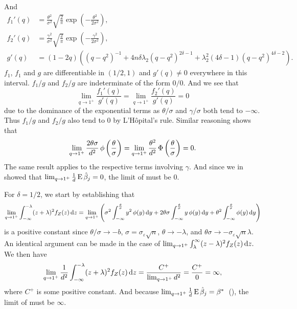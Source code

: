 And
\begin{align*}
  f_1'(q) & = \frac{\theta^2}{\sigma^2}\sqrt{\frac{2}{\pi}}\exp\left(-\frac{\theta^2}{2\sigma^2}\right),                                    \\
  f_2'(q) & = \frac{\gamma^2}{\sigma^2}\sqrt{\frac{2}{\pi}}\exp\left(-\frac{\gamma^2}{2\sigma^2}\right),                                    \\
  g'(q)   & = (1-2q)\left((q-q^2)^{-1} + 4n\delta \lambda_2 (q-q^2)^{2\delta - 1} + \lambda_2^2 (4 \delta - 1)(q-q^2)^{4\delta - 2}\right).
\end{align*}
\(f_1\), \(f_1\) and \(g\) are differentiable in \((1/2, 1)\) and \(g'(q) \neq 0\) everywhere in this interval. \(f_1/g\) and \(f_2/g\) are indeterminate of the form \(0/0\). And we see that
\[
  \lim_{q \rightarrow 1^+} \frac{f_1'(q)}{g'(q)} = \lim_{q \rightarrow 1^+} \frac{f_2'(q)}{g'(q)} = 0
\]
due to the dominance of the exponential terms as \(\theta/\sigma\) and \(\gamma/\sigma\)
both tend to \(-\infty\). Thus \(f_1/g\) and \(f_2/g\) also tend to 0 by L'Hôpital's rule.
Similar reasoning shows that
\[
  \lim_{q \rightarrow 1^+} \frac{2\theta \sigma}{d^2} \operatorname{\phi} \left(\frac{\theta}{\sigma}\right) = \lim_{q \rightarrow 1^+} \frac{\theta^2}{d^2} \operatorname{\Phi} \left(\frac{\theta}{\sigma}\right) = 0.
\]
The same result applies to the respective terms involving \(\gamma\). And since we in
 showed that \(\lim_{q\rightarrow 1^+} \frac{1}{d} \operatorname{E}
\hat{\beta}_j = 0\), the limit of  must be 0.

For \(\delta = 1/2\), we start by establishing that
\[
  \lim_{q \rightarrow 1^+} \int_{-\infty}^{-\lambda}(z+ \lambda)^2 f_Z(z) \mathop{}\!\mathrm{d} z = \lim_{q \rightarrow 1^+} \left(\sigma^2 \int_{-\infty}^\frac{\theta}{\sigma} y^2 \operatorname{\phi}(y) \mathop{}\!\mathrm{d} y + 2 \theta \sigma \int_{-\infty}^\frac{\theta}{\sigma} y \operatorname{\phi}(y) \mathop{}\!\mathrm{d} y + \theta^2 \int_{-\infty}^\frac{\theta}{\sigma} \operatorname{\phi}(y) \mathop{}\!\mathrm{d} y\right)
\]
is a positive constant since \(\theta/\sigma \rightarrow -b\), \(\sigma =
\sigma_\varepsilon \sqrt{n}\), \(\theta \rightarrow - \lambda\), and \(\theta\sigma
\rightarrow - \sigma_\varepsilon \sqrt{n}\lambda\). An identical argument can be made in
the case of \(\lim_{q \rightarrow 1^+} \int_{\lambda}^{\infty}(z - \lambda)^2 f_Z(z) \mathop{}\!\mathrm{d}
z.\) We then have
\[
  \lim_{q \rightarrow 1^+} \frac{1}{d^2} \int_{-\infty}^{-\lambda}(z+ \lambda)^2 f_Z(z) \mathop{}\!\mathrm{d} z = \frac{C^+}{\lim_{q\rightarrow 1^+} d^2} = \frac{C^+}{0} = \infty,
\]
where \(C^+\) is some positive constant. And because \(\lim_{q\rightarrow 1^+} \frac{1}{d}
\operatorname{E} \hat{\beta}_j = \beta^*\)~(), the limit of
 must be \(\infty\).

